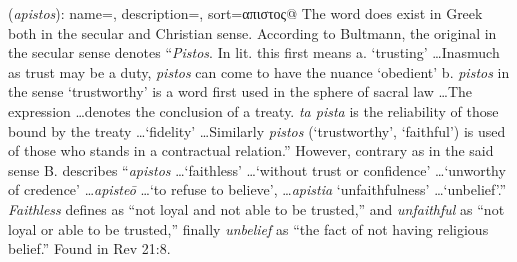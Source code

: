 \item[Unfaithful (to God),]

(\textit{apistos}):
{
    name=,
    description={},
    sort=απιστος@
}
The word does exist in Greek both in the secular and Christian sense. According to Bultmann, the original  in the secular sense denotes ``\emph{Pistos}. In lit. this first means  a. `trusting' \ldots Inasmuch as trust may be a duty, \emph{pistos} can come to have the nuance `obedient' b. \emph{pistos} in the sense `trustworthy' is a word first used in the sphere of sacral law \ldots The expression \ldots denotes the conclusion of a treaty. \emph{ta pista} is the reliability of those bound by the treaty \ldots `fidelity' \ldots Similarly \emph{pistos} (`trustworthy', `faithful') is used of those who stands in a contractual relation.''
However, contrary as in the said sense B. describes ``\emph{apistos} \ldots `faithless' \ldots `without trust or confidence' \ldots `unworthy of credence' \ldots \emph{apisteō} \ldots `to refuse to believe', \ldots \emph{apistia} `unfaithfulness' \ldots `unbelief'.''
\emph{Faithless} defines as ``not loyal and not able to be trusted,'' and \emph{unfaithful} as ``not loyal or able to be trusted,'' finally \emph{unbelief} as ``the fact of not having religious belief.''
Found in Rev 21:8.
